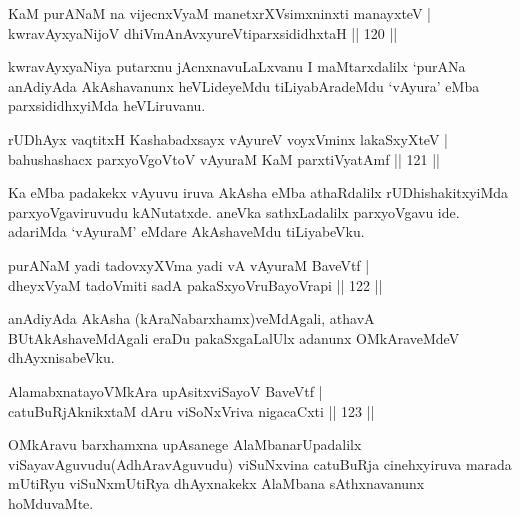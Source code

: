 
\begin{shl}
KaM purANaM na vijecnxVyaM manetxrXV\s simxninxti manayxteV  | \\
kwravAyxyaNijoV dhiVmAnAvxyureVtiparxsididhxtaH \hfill||  120 ||  
\end{shl}

\begin{artha}
kwravAyxyaNiya putarxnu jAcnxnavuLaLxvanu I maMtarxdalilx `purANa anAdiyAda AkAshavanunx heVLideyeMdu tiLiyabAradeMdu `vAyura' eMba parxsididhxyiMda heVLiruvanu.
\end{artha}


\begin{shl}
rUDhAyx vaqtitxH Kashabadxsayx vAyureV voyxVminx lakaSxyXteV  | \\
bahushashacx parxyoVgoV\s toV vAyuraM KaM parxtiVyatAmf \hfill||  121 ||  
\end{shl}

\begin{artha}
Ka eMba padakekx vAyuvu iruva AkAsha eMba athaRdalilx rUDhishakitxyiMda parxyoVgaviruvudu kANutatxde. aneVka sathxLadalilx parxyoVgavu ide. adariMda `vAyuraM' eMdare AkAshaveMdu tiLiyabeVku.
\end{artha}


\begin{shl}
purANaM yadi tadovxyXVma yadi vA vAyuraM BaveVtf  | \\
dheyxVyaM tadoVmiti sadA pakaSxyoVruBayoVrapi \hfill||  122 ||  
\end{shl}

\begin{artha}
anAdiyAda AkAsha (kAraNabarxhamx)veMdAgali, athavA BUtAkAshaveMdAgali eraDu pakaSxgaLalUlx adanunx OMkAraveMdeV dhAyxnisabeVku.
\end{artha}

\begin{shl}
AlamabxnatayoVMkAra upAsitxviSayoV BaveVtf  | \\
catuBuRjAknikxtaM dAru viSoNxVriva nigacaCxti \hfill||  123 ||  
\end{shl}

\begin{artha}
OMkAravu barxhamxna upAsanege AlaMbanarUpadalilx viSayavAguvudu\break (AdhAravAguvudu) viSuNxvina catuBuRja cinehxyiruva marada mUtiRyu viSuNxmUtiRya dhAyxnakekx AlaMbana sAthxnavanunx hoMduvaMte.
\end{artha}

